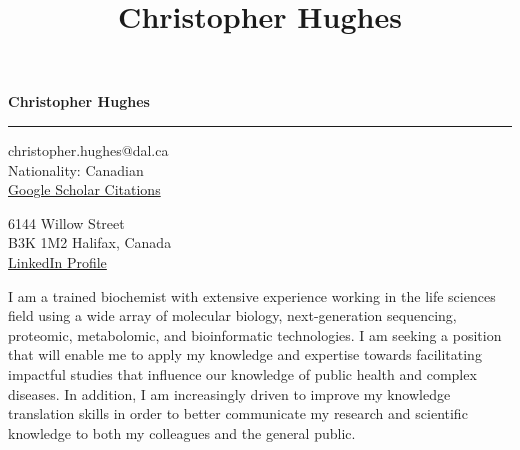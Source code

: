 \documentclass[11pt]{article}
\title{\bfseries\Huge Christopher Hughes}
\author{}
\date{}
\begin{document}
	\newpage
	\setcounter{page}{1}
	\noindent

\begin{LARGE}

	\noindent\textbf{Christopher Hughes}\vspace{1pt}

\end{LARGE}


\noindent\rule{\textwidth}{1pt}\vspace{9pt}

\noindent
\begin{minipage}{0.5\textwidth}
	\begin{flushleft}
		christopher.hughes@dal.ca\\
		Nationality: Canadian\\ \href{https://scholar.google.com/citations?user=jPSwBGwAAAAJ}{Google Scholar Citations}
	\end{flushleft}
\end{minipage}%
\begin{minipage}{0.5\textwidth}
	\begin{flushright}
		6144 Willow Street\\
		B3K 1M2 Halifax, Canada\\ \href{https://www.linkedin.com/in/christopher-hughes-612460133/}{LinkedIn Profile}
	\end{flushright}
\end{minipage}\vspace{18pt}


I am a trained biochemist with extensive experience working in the life sciences field using a wide array of molecular biology, next-generation sequencing, proteomic, metabolomic, and bioinformatic technologies. I am seeking a position that will enable me to apply my knowledge and expertise towards facilitating impactful studies that influence our knowledge of public health and complex diseases. In addition, I am increasingly driven to improve my knowledge translation skills in order to better communicate my research and scientific knowledge to both my colleagues and the general public.\\ 
\end{document}
